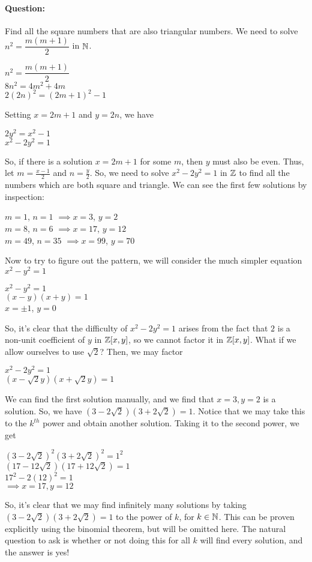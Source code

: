 \documentclass[../main.tex]{subfiles}
\begin{document}
\paragraph{Question:} Find all the square numbers that are also triangular numbers. \sspace
We need to solve $n^2=\dfrac{m(m+1)}{2}$ in $\mathbb{N}$. 
\begin{center}
   $n^2=\dfrac{m(m+1)}{2}$ \\
   $8n^2=4m^2+4m$ \\
   $2(2n)^2=(2m+1)^2-1$
\end{center}
Setting $x=2m+1$ and $y=2n$, we have 
\begin{center}
    $2y^2=x^2-1$ \\
    $x^2-2y^2=1$
\end{center}
So, if there is a solution $x=2m+1$ for some $m$, then $y$ must also be even. Thus, let $m=\tfrac{x-1}{2}$ and $n=\tfrac{y}{2}$. So, we need to solve $x^2-2y^2=1$ in $\mathbb{Z}$ to find all the numbers which are both square and triangle. We can see the first few solutions by inspection:
\begin{center}
    $m=1$, $n=1$ $\implies x=3$, $y=2$ \\
    $m=8$, $n=6$ $\implies x=17$, $y=12$ \\
    $m=49$, $n=35$ $\implies x=99$, $y=70$
\end{center}
Now to try to figure out the pattern, we will consider the much simpler equation $x^2-y^2=1$
\begin{center}
    $x^2-y^2=1$ \\
    $(x-y)(x+y)=1$ \\
    $x=\pm 1$, $y=0$
\end{center}
So, it's clear that the difficulty of $x^2-2y^2=1$ arises from the fact that $2$ is a non-unit coefficient of $y$ in $\mathbb{Z}[x,y]$, so we cannot factor it in $\mathbb{Z}[x,y]$. What if we allow ourselves to use $\sqrt{2}$? Then, we may factor 
\begin{center}
    $x^2-2y^2=1$ \\
    $(x-\sqrt{2}y)(x+\sqrt{2}y)=1$
\end{center}
We can find the first solution manually, and we find that $x=3,y=2$ is a solution. So, we have $(3-2\sqrt{2})(3+2\sqrt{2})=1$. Notice that we may take this to the $k^{th}$ power and obtain another solution. Taking it to the second power, we get
\begin{center}
    $(3-2\sqrt{2})^2(3+2\sqrt{2})^2=1^2$ \\
    $(17-12\sqrt{2})(17+12\sqrt{2})=1$ \\
    $17^2-2(12)^2=1$ \\
    $\implies x=17, y=12$
\end{center}
So, it's clear that we may find infinitely many solutions by taking $(3-2\sqrt{2})(3+2\sqrt{2})=1$ to the power of $k$, for $k \in \mathbb{N}$. This can be proven explicitly using the binomial theorem, but will be omitted here. The natural question to ask is whether or not doing this for all $k$ will find every solution, and the answer is yes!
\end{document}
